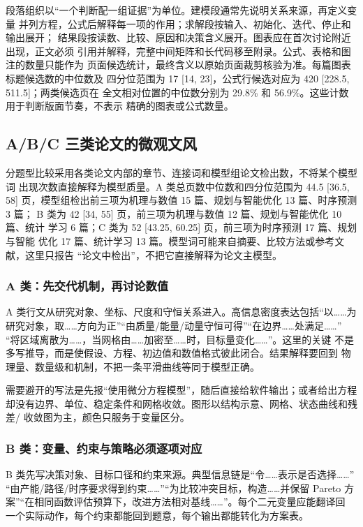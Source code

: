 \documentclass[UTF8,a4paper,12pt]{ctexart}
\begin{document}
段落组织以“一个判断配一组证据”为单位。建模段通常先说明关系来源，再定义变量
并列方程，公式后解释每一项的作用；求解段按输入、初始化、迭代、停止和输出展开；
结果段按读数、比较、原因和决策含义展开。图表应在首次讨论附近出现，正文必须
引用并解释，完整中间矩阵和长代码移至附录。公式、表格和图注的数量只能作为
页面候选统计，最终含义以原始页面裁剪核验为准。每篇图表标题候选数的中位数及
四分位范围为 17 [14, 23]，公式行候选对应为 420 [228.5, 511.5]；两类候选页在
全文相对位置的中位数分别为 29.8\% 和 56.9\%。这些计数用于判断版面节奏，不表示
精确的图表或公式数量。

\subsection{A/B/C 三类论文的微观文风}

分题型比较采用各类论文内部的章节、连接词和模型组论文检出数，不将某个模型词
出现次数直接解释为模型质量。A 类总页数中位数和四分位范围为 44.5 [36.5, 58]
页，模型组检出前三项为机理与数值 15 篇、规划与智能优化 13 篇、时序预测 3 篇；
B 类为 42 [34, 55] 页，前三项为机理与数值 12 篇、规划与智能优化 10 篇、统计
学习 6 篇；C 类为 52 [43.25, 60.25] 页，前三项为时序预测 17 篇、规划与智能
优化 17 篇、统计学习 13 篇。模型词可能来自摘要、比较方法或参考文献，这里只报告
“论文中检出”，不把它直接解释为论文主模型。

\subsubsection{A 类：先交代机制，再讨论数值}

A 类行文从研究对象、坐标、尺度和守恒关系进入。高信息密度表达包括“以……为
研究对象，取……方向为正”“由质量/能量/动量守恒可得”“在边界……处满足……”
“将区域离散为……，当网格由……加密至……时，目标量变化……”。这里的关键
不是多写推导，而是使假设、方程、初边值和数值格式彼此闭合。结果解释要回到
物理量、数量级和机制，不把一条平滑曲线等同于模型正确。

需要避开的写法是先报“使用微分方程模型”，随后直接给软件输出；或者给出方程
却没有边界、单位、稳定条件和网格收敛。图形以结构示意、网格、状态曲线和残差/
收敛图为主，颜色只服务于变量区分。

\subsubsection{B 类：变量、约束与策略必须逐项对应}

B 类先写决策对象、目标口径和约束来源。典型信息链是“令……表示是否选择……”
“由产能/路径/时序要求得到约束……”“为比较冲突目标，构造……并保留 Pareto
方案”“在相同函数评估预算下，改进方法相对基线……”。每个二元变量应能翻译回
一个实际动作，每个约束都能回到题意，每个输出都能转化为方案表。
\end{document}
